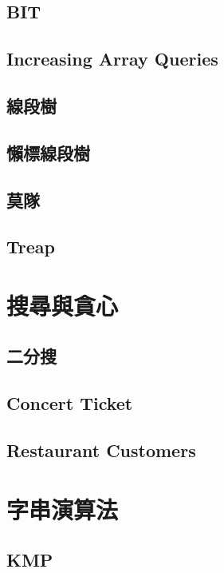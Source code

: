 \subsection{BIT} 

\subsection{Increasing Array Queries}

\subsection{線段樹}

\subsection{懶標線段樹}

\subsection{莫隊}

\subsection{Treap}


\section{搜尋與貪心}
\subsection{二分搜} 

\subsection{Concert Ticket}

\subsection{Restaurant Customers}


\section{字串演算法}
\subsection{KMP} 



